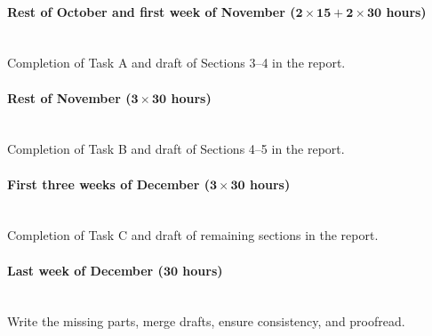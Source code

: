 \documentclass{article}
\newcommand{\timeest}[1]{$\mathbf{#1}$}%
\begin{document}
\paragraph{Rest of October and first week of November (\timeest{2\times 15+2\times 30} hours)}~\\\noindent
Completion of Task A and draft of Sections 3--4 in the report.

\paragraph{Rest of November (\timeest{3\times 30} hours)}~\\\noindent
Completion of Task B and draft of Sections 4--5 in the report.

\paragraph{First three weeks of December (\timeest{3\times 30} hours)}~\\\noindent
Completion of Task C and draft of remaining sections in the report.

\paragraph{Last week of December (\timeest{30} hours)}~\\\noindent
Write the missing parts, merge drafts, ensure consistency, and proofread.
\end{document}
